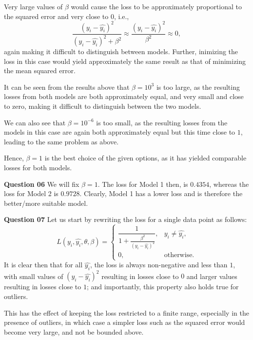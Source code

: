 \documentclass{article}[a4paper]
\begin{document}
	Very large values of $\beta$ would cause the loss to be approximately proportional to the squared error and
	very close to $0$, i.e., \[
		\dfrac{\left( y_i - \hat{y_i} \right)^2}{\left( y_i - \hat{y_i} \right)^2 + \beta^2}
		\approx
		\dfrac{\left( y_i - \hat{y_i} \right)^2}{\beta^2}
		\approx
		0,
	\] again making it difficult to distinguish between models. Further, inimizing the loss in this
	case would yield approximately the same result as that of minimizing the mean squared error.
	\newline

	It can be seen from the results above that $\beta = 10^3$ is too large, as the resulting losses from both
	models are both approximately equal, and very small and close to zero, making it difficult to distinguish
	between the two models.
	\newline

	We can also see that $\beta = 10^{-6}$ is too small, as the resulting losses from the models in this 
	case are again both approximately equal but this time close to $1$, leading to the same problem as above.
	\newline

	Hence, $\beta = 1$ is the best choice of the given options, as it has yielded comparable losses for both
	models.
	\newline

	\textbf{Question 06} We will fix $\beta = 1$. The loss for Model 1 then, is $0.4354$, whereas the loss
	for Model 2 is $0.9728$. Clearly, Model 1 has a lower loss and is therefore the better/more suitable model.
	\newline

	\textbf{Question 07} Let us start by rewriting the loss for a single data point as follows: \[
		L\left(y_i, \hat{y_i}, \theta, \beta\right)
		=
		\begin{cases}
			\dfrac{1}{1 + \frac{\beta^2}{\left(y_i - \hat{y_i}\right)^2}},	& y_i \ne \hat{y_i}, \\
			0,																& \text{otherwise}.
		\end{cases}
	\] It is clear then that for all $\hat{y_i}$, the loss is always non-negative and less than $1$, with
	small values of $\left(y_i - \hat{y_i}\right)^2$ resulting in losses close to $0$ and larger values
	resulting in losses close to $1$; and importantly, this property also holds true for outliers.
	\newline

	This has the effect of keeping the loss restricted to a finite range, especially in the presence of outliers,
	in which case a simpler loss such as the squared error would become very large, and not be bounded above.
	\newline
	
\end{document}
